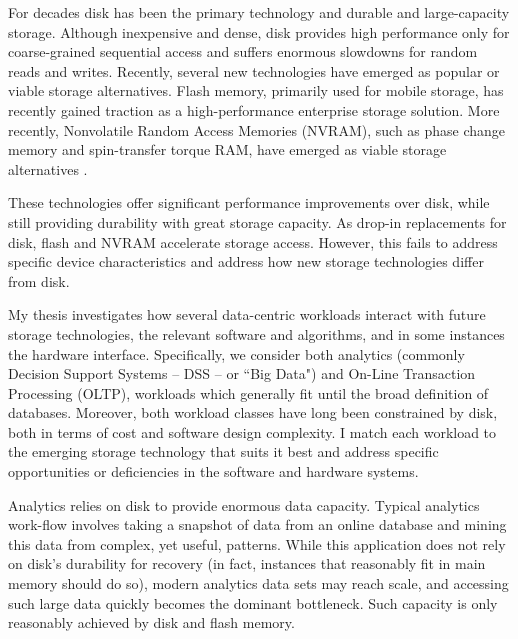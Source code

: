 For decades disk has been the primary technology and durable and large-capacity storage.
Although inexpensive and dense, disk provides high performance only for coarse-grained sequential access and suffers enormous slowdowns for random reads and writes.
Recently, several new technologies have emerged as popular or viable storage alternatives.
Flash memory, primarily used for mobile storage, has recently gained traction as a high-performance enterprise storage solution.
More recently, Nonvolatile Random Access Memories (NVRAM), such as phase change memory and spin-transfer torque RAM, have emerged as viable storage alternatives .

These technologies offer significant performance improvements over disk, while still providing durability with great storage capacity.
As drop-in replacements for disk, flash and NVRAM accelerate storage access.
However, this fails to address specific device characteristics and address how new storage technologies differ from disk.

My thesis investigates how several data-centric workloads interact with future storage technologies, the relevant software and algorithms, and in some instances the hardware interface.
Specifically, we consider both analytics (commonly Decision Support Systems -- DSS -- or ``Big Data") and On-Line Transaction Processing (OLTP), workloads which generally fit until the broad definition of databases.
Moreover, both workload classes have long been constrained by disk, both in terms of cost and software design complexity.
I match each workload to the emerging storage technology that suits it best and address specific opportunities or deficiencies in the software and hardware systems.

Analytics relies on disk to provide enormous data capacity.
Typical analytics work-flow involves taking a snapshot of data from an online database and mining this data from complex, yet useful, patterns.
While this application does not rely on disk's durability for recovery (in fact, instances that reasonably fit in main memory should do so), modern analytics data sets may reach  scale, and accessing such large data quickly becomes the dominant bottleneck.
Such capacity is only reasonably achieved by disk and flash memory.

